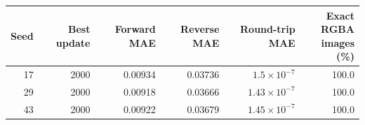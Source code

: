 \begin{tabular}{rrrrrr}
\toprule
Seed & Best update & Forward MAE & Reverse MAE & Round-trip MAE & \shortstack{Exact RGBA\\images (\%)} \\
\midrule
17 & 2000 & 0.00934 & 0.03736 & $1.5\times10^{-7}$ & 100.0 \\
29 & 2000 & 0.00918 & 0.03666 & $1.43\times10^{-7}$ & 100.0 \\
43 & 2000 & 0.00922 & 0.03679 & $1.45\times10^{-7}$ & 100.0 \\
\bottomrule
\end{tabular}
